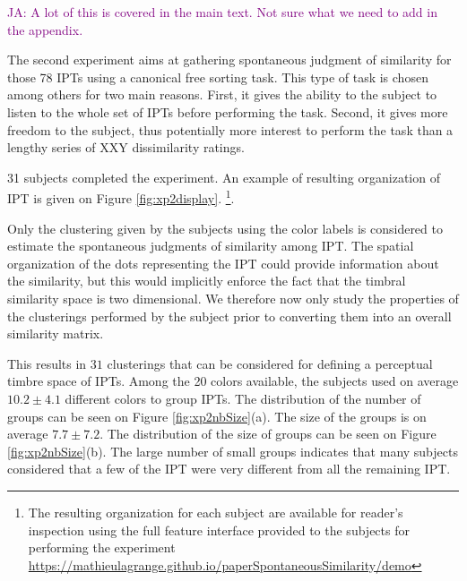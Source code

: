 \documentclass{bmcart}
\newcommand{\ipt}{IPT\xspace}
\newcommand{\ipts}{IPTs\xspace}
\newcommand{\ja}[1]{\textcolor{purple}{JA: #1}\xspace}
\begin{document}
\begin{backmatter}
\ja{A lot of this is covered in the main text.
Not sure what we need to add in the appendix.}

The second experiment aims at gathering spontaneous judgment of similarity for those 78 \ipts using a canonical free sorting task. This type of task is chosen among others for two main reasons. First, it gives the ability to the subject to listen to the whole set of \ipts before performing the task. Second, it gives more freedom to the subject, thus potentially more interest to perform the task than a lengthy series of XXY dissimilarity ratings.

31 subjects completed the experiment. An example of resulting organization of \ipt is given on Figure \ref{fig:xp2display}. \footnote{The resulting organization for each subject are available for reader's inspection using the full feature interface provided to the subjects for performing the experiment \url{https://mathieulagrange.github.io/paperSpontaneousSimilarity/demo}}.

Only the clustering given by the subjects using the color labels is considered to estimate the spontaneous judgments of similarity among \ipt. The spatial organization of the dots representing the \ipt could provide information about the similarity, but this would implicitly enforce the fact that the timbral similarity space is two dimensional. We therefore now only study the properties of the clusterings performed by the subject prior to converting them into an overall similarity matrix.

This results in $31$ clusterings that can be considered for defining a perceptual timbre space of \ipts. Among the 20 colors available, the subjects used on average $10.2 \pm  4.1$ different colors to group \ipts. The distribution of the number of groups can be seen on Figure \ref{fig:xp2nbSize}(a). The size of the groups is on average $7.7 \pm   7.2$. The distribution of the size of groups can be seen on Figure \ref{fig:xp2nbSize}(b). The large number of small groups indicates that many subjects considered that a few of the \ipt were very different from all the remaining \ipt.


\end{backmatter}
\end{document}
